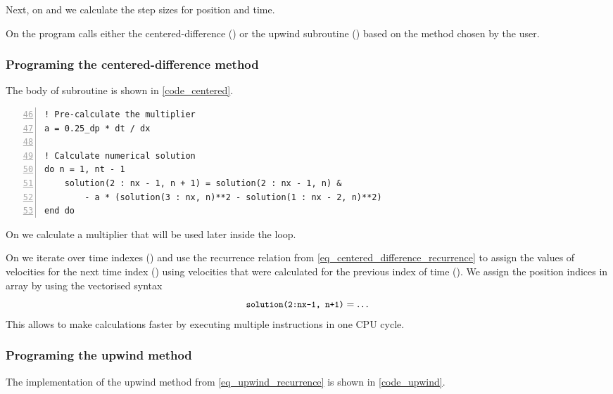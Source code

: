 Next, on  and  we calculate the step sizes for position and time.

On  the program calls either the centered-difference () or the upwind subroutine () based on the method chosen by the user.


\subsubsection{Programing the centered-difference method}

The body of  subroutine is shown in \autoref{code_centered}.

\noindent\begin{minipage}{\linewidth}
\begin{lstlisting}[caption={Code for centered-difference method of solving advection equation (\code{advection\_equation.f90}).},frame=tlrb,label={code_centered}, numbers=left, firstnumber=46]
! Pre-calculate the multiplier
a = 0.25_dp * dt / dx

! Calculate numerical solution
do n = 1, nt - 1
    solution(2 : nx - 1, n + 1) = solution(2 : nx - 1, n) &
        - a * (solution(3 : nx, n)**2 - solution(1 : nx - 2, n)**2)
end do
\end{lstlisting}
\end{minipage}

On  we calculate a multiplier that will be used later inside the loop.

On  we iterate over time indexes () and use the recurrence relation from \autoref{eq_centered_difference_recurrence} to assign the values of velocities for the next time index () using velocities that were calculated for the previous index of time (). We assign the position indices in  array by using the vectorised syntax
\[
  \texttt{\small solution(2:nx-1, n+1)} = \dots
\]
This allows to make calculations faster by executing multiple instructions in one CPU cycle.


\subsubsection{Programing the upwind method}

The implementation of the upwind method from \autoref{eq_upwind_recurrence} is shown in \autoref{code_upwind}.

